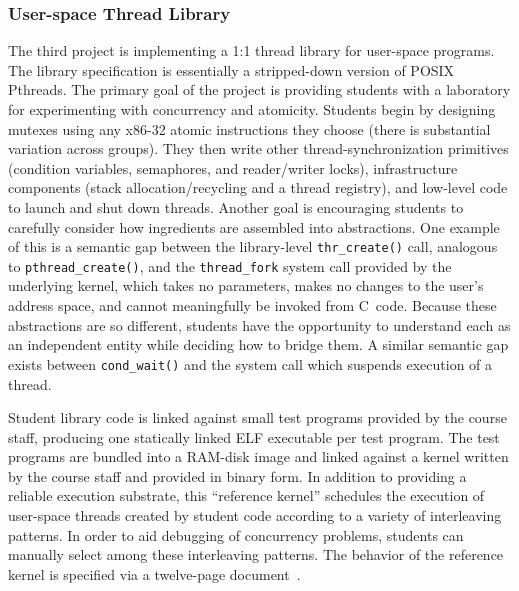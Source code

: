 \subsubsection{User-space Thread Library}
The third project is implementing a 1:1 thread library for
user-space programs.
The library specification is essentially a stripped-down
version of POSIX Pthreads.
The primary goal of the project is providing students
with a laboratory for
experimenting with concurrency and atomicity.
Students begin by designing mutexes using any
x86-32 atomic instructions they choose
(there is substantial variation across groups).
They then write other thread-synchronization
primitives (condition variables, semaphores,
and reader/writer locks), infrastructure
components (stack allocation/recycling and
a thread registry),
and low-level code to launch and shut down
threads.
Another goal is encouraging students to carefully
consider how ingredients are assembled into
abstractions.
One example of this is a semantic gap
between the library-level \texttt{thr\_create()}
call, analogous to \texttt{pthread\_create()},
and the \texttt{thread\_fork} system call provided
by the underlying kernel,
which takes no parameters,
makes no changes to the user's address space,
and cannot meaningfully
be invoked from C~code.
Because these abstractions are so different,
students have the opportunity to
understand each as an independent entity while
deciding how to bridge them.
A similar semantic gap exists between
\texttt{cond\_wait()} and the system call
which suspends execution of a thread.

Student library code is linked against small
test programs provided by the course staff,
producing one statically linked ELF executable
per test program.
The test programs are bundled into a RAM-disk
image and linked against a kernel written by
the course staff
and provided in binary form.
%
In addition to providing a reliable execution
substrate,
this ``reference kernel'' schedules
the execution of user-space threads created by
student code according to a variety of
interleaving patterns.
In order to aid debugging of concurrency problems,
students can manually select among these
interleaving patterns.
The behavior of the reference kernel is specified
via a twelve-page document~\cite{kspec}.

